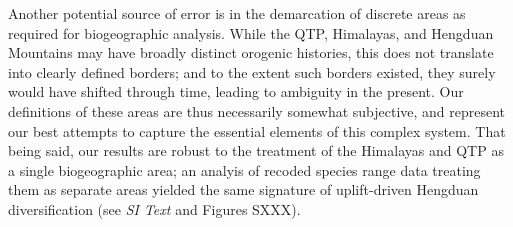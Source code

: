 Another potential source of error is in the demarcation of discrete
areas as required for biogeographic analysis. While the QTP,
Himalayas, and Hengduan Mountains may have broadly distinct orogenic
histories, this does not translate into clearly defined borders; and
to the extent such borders existed, they surely would have shifted
through time, leading to ambiguity in the present. Our definitions of
these areas are thus necessarily somewhat subjective, and represent
our best attempts to capture the essential elements of this complex
system. That being said, our results are robust to the treatment of
the Himalayas and QTP as a single biogeographic area; an analyis of
recoded species range data treating them as separate areas yielded the
same signature of uplift-driven Hengduan diversification (see
\textit{SI Text} and Figures SXXX).








